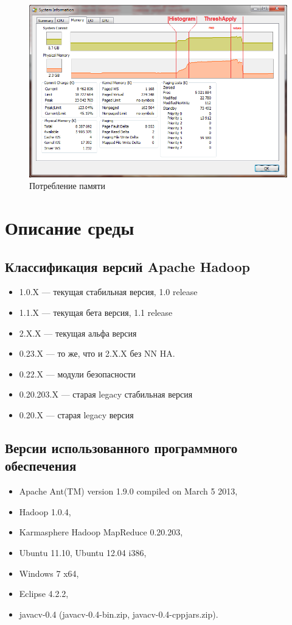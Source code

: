 \documentclass[12pt,a4paper]{extarticle} %
\begin{document}
\begin{figure}[h]
    \centering
    \includegraphics[width=\textwidth]{images/memprofjob.png}
	\caption{Потребление памяти}
\end{figure}

\newpage\clearpage
\section{Описание среды}

\subsection{Классификация версий Apache Hadoop}
\begin{itemize}
    \item[] 1.0.X ---  текущая стабильная версия, 1.0 release
    \item[] 1.1.X  ---  текущая бета версия, 1.1 release
    \item[] 2.X.X  ---  текущая альфа версия
    \item[] 0.23.X  ---  то же, что и 2.X.X без NN HA.
    \item[] 0.22.X  ---  модули безопасности 
    \item[] 0.20.203.X  ---  старая legacy стабильная версия
    \item[] 0.20.X  ---  старая legacy версия
\end{itemize}


\subsection{Версии использованного программного обеспечения} \label{sec:envsoft}
\begin{itemize}
    \item[] Apache Ant(TM) version 1.9.0 compiled on March 5 2013,
    \item[] Hadoop 1.0.4,
    \item[] Karmasphere Hadoop MapReduce 0.20.203,
    \item[] Ubuntu 11.10, Ubuntu 12.04 i386,
    \item[] Windows 7 x64,
    \item[] Eclipse 4.2.2,
    \item[] javacv-0.4 (javacv-0.4-bin.zip, javacv-0.4-cppjars.zip).
\end{itemize}
\end{document}
